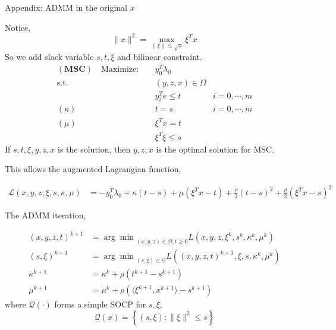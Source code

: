 \documentclass[aspectratio=1610, 9pt]{beamer}
\newcommand{\model}[1]{(\textbf{#1})}
\begin{document}
\begin{frame}[allowframebreaks]{\hypertarget{oldad}{Appendix: ADMM in the original \(x\)}}

  Notice,
  \begin{equation}
    \|x\|^2 = \max_{\|\xi\| \le \sqrt s} \xi^T x
  \end{equation}
  So we add slack variable \(s, t, \xi\) and bilinear constraint.
  \begin{align}
    \model{MSC} \quad \mathrm{Maximize: }\quad & y_0 ^T\lambda_0                     \\
    \mathrm{s.t.} \quad                        & (y,z,x) \in \Omega                  \\
                                               & y_i^Te \le t       & i=0, \cdots, m \\
    (\kappa) \quad                             & t= s               & i=0, \cdots, m \\
    (\mu)    \quad                             & \xi^Tx = t                          \\
                                               & \xi^T\xi \le s
  \end{align}
  If \(s, t, \xi, y, z, x\) is the solution, then \( y, z, x\) is the optimal solution for MSC.

  This allows the augmented Lagrangian function,

  \begin{align*}
    \mathscr L\left(x,y,z,\xi,s,\kappa,\mu\right) & = - y_0 ^T\lambda_0 + \kappa(t-s) + \mu(\xi^Tx - t) + \frac{\rho}{2}(t-s)^2 + \frac{\rho}{2}(\xi^Tx - s)^2
  \end{align*}

  The ADMM iteration,

  \begin{align*}
    (x,y,z,t)^{k+1} & = {\arg\min}_{(x,y,z)\in\Omega, t\ge 0} L\left(x,y,z,\xi^k,s^k,\kappa^k,\mu^k\right)       \\
    (s, \xi)^{k+1}  & = {\arg\min}_{(s, \xi)\in\mathscr{Q}} L\left((x,y,z,t)^{k+1},\xi,s, \kappa^k, \mu^k\right) \\
    \kappa^{k+1}    & = \kappa^k + \rho\left(t^{k+1}-s^{k+1}\right)                                              \\
    \mu^{k+1}       & = \mu^k + \rho\left( \langle\xi^{k+1}, x^{k+1}\rangle - s^{k+1}\right)
  \end{align*}
  where \(\mathscr{Q(\cdot)}\) forms a simple SOCP for \(s, \xi\),
  \begin{equation}
    \mathscr{Q}(x) =\left\{(s,\xi): \|\xi\|^2 \le s\right\}
  \end{equation}

\end{frame}
\end{document}
